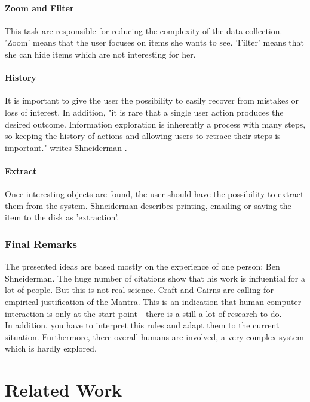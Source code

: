 \documentclass[11pt]{report}
\begin{document}
{{\subsubsection{Zoom and Filter}

This task are responsible for reducing the complexity of the data collection. 'Zoom' means that the user focuses on items she wants to see. 'Filter' means that she can hide items which are not interesting for her.

\subsubsection{History}

It is important to give the user the possibility to easily recover from mistakes or loss of interest. In addition, "it is rare that a single user action produces the desired outcome. Information exploration is inherently a process with many steps, so keeping the history of actions and allowing users to retrace their steps is important." writes Shneiderman \cite{Shneiderman1996}.

\subsubsection{Extract}

Once interesting objects are found, the user should have the possibility to extract them from the system. Shneiderman describes printing, emailing or saving the item to the disk as 'extraction'.

\subsection{Final Remarks}

The presented ideas are based mostly on the experience of one person: Ben Shneiderman. The huge number of citations show that his work is influential for a lot of people. But this is not real science. Craft and Cairns \cite{Craft2005} are calling for empirical justification of the Mantra. This is an indication that human-computer interaction is only at the start point - there is a still a lot of research to do. \\

In addition, you have to interpret this rules and adapt them to the current situation. Furthermore, there overall humans are involved, a very complex system which is hardly explored.

\chapter{Related Work} \label{Related Work}

}}
\end{document}
